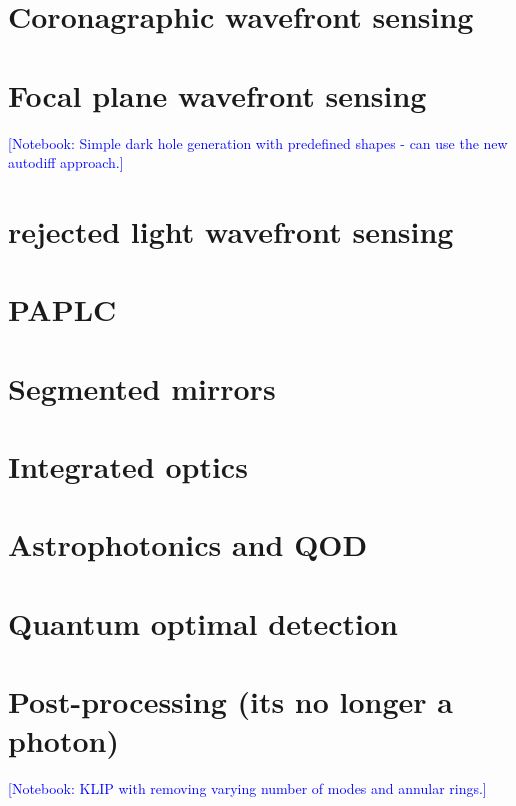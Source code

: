 \documentclass[letterpaper]{ar-1col}
\newcommand{\notebooksuggestion}[1]{\textcolor{blue}{[Notebook: #1]}}
\begin{document}
\section{Coronagraphic wavefront sensing}
\lipsum[2-4]

\section{Focal plane wavefront sensing}

\notebooksuggestion{Simple dark hole generation with predefined shapes - can use the new autodiff approach.}

\lipsum[2-4]

\section{rejected light wavefront sensing} 
\lipsum[2-4]

\section{PAPLC}
\lipsum[2-4]

\section{Segmented mirrors}
\lipsum[2-4]

\section{Integrated optics}
\lipsum[2-4]

\section{Astrophotonics and QOD}
\lipsum[2-4]

\section{Quantum optimal detection}
\lipsum[2-4]

\section{Post-processing (its no longer a photon)}

\notebooksuggestion{KLIP with removing varying number of modes and annular rings.}

\lipsum[2-4]
\end{document}
